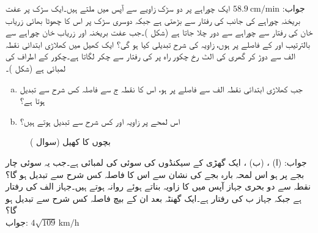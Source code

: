 جواب:\quad
$\SI{58.9}{\centi\meter/\minute}$
\quad
ایک چوراہے پر دو سڑک  زاویے سے آپس میں ملتے ہیں۔ایک سڑک پر عفت بریخنہ چوراہے کی جانب  کی رفتار سے بڑھتی ہے جبکہ دوسری سڑک پر اس کا چھوٹا بھائی زریاب خان  کی رفتار سے چوراہے سے دور چلا جاتا ہے (شکل )۔جب عفت بریخنہ اور زریاب خان چوراہے سے بالترتیب  اور  کے فاصلے پر ہوں، زاویہ  کی شرح تبدیلی کیا ہو گی؟ 
ایک کھیل میں کھلاڑی ابتدائی نقطہ الف سے دوڑ کر گھری کی الٹ رخ چکور راہ پر  کی رفتار سے چکر لگاتا ہے۔چکور کے اطراف کی لمبائی  ہے (شکل )۔
\begin{enumerate}[a.]
\item
جب کھلاڑی ابتدائی نقطہ الف سے  فاصلے پر ہو، اس کا نقطہ ج سے فاصلہ کس شرح سے تبدیل ہوتا ہے؟
\item
اس لمحے پر زاویہ  اور  کس شرح سے تبدیل ہوتے ہیں؟ 
\end{enumerate}
%
\begin{figure}
\centering
{}
\caption{بچوں کا کھیل (سوال )}
\label{شکل_سوال_تفرق_کھیل}
\end{figure}

جواب:\quad
(ا) ، (ب) ، 
ایک گھڑی کے سیکنڈوں کی سوئی کی لمبائی  ہے۔جب یہ سوئی چار بجے پر ہو اس لمحہ بارہ بجے کی نشان سے اس کا فاصلہ کس شرح سے تبدیل ہو گا؟ 
\quad
نقطہ  سے دو بحری جہاز آپس میں  کا زاویہ بناتے ہوئے روانہ ہوتے ہیں۔جہاز الف کی رفتار  ہے جبکہ جہاز ب کی رفتار  ہے۔ایک گھنٹہ بعد ان کے بیچ فاصلہ کس شرح سے تبدیل ہو گا؟\\
جواب:\quad
$4\sqrt{109}\,\si{\kilo\meter\per\hour}$
